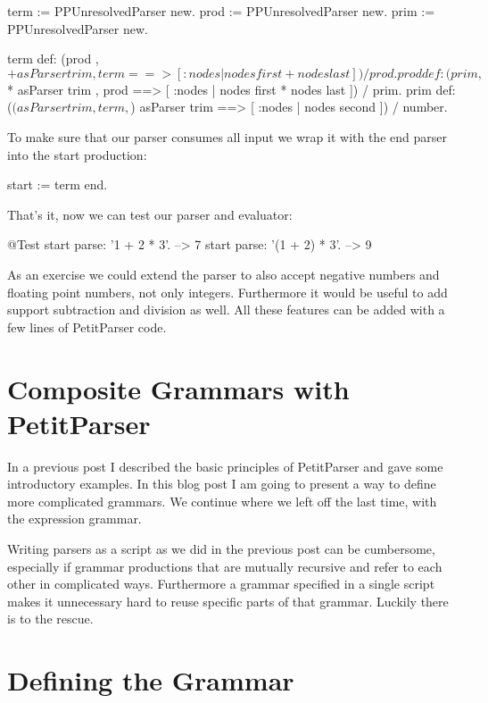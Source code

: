 \documentclass[a4paper,10pt,twoside]{book}
\begin{document}
\begin{code}{}
term := PPUnresolvedParser new.
prod := PPUnresolvedParser new.
prim := PPUnresolvedParser new.
 
term def: (prod , $+ asParser trim , term ==> [ :nodes | nodes first + nodes last ])
   / prod.
prod def: (prim , $* asParser trim , prod ==> [ :nodes | nodes first * nodes last ])
   / prim.
prim def: ($( asParser trim , term , $) asParser trim ==> [ :nodes | nodes second ])
   / number.
\end{code}

To make sure that our parser consumes all input we wrap it with the end parser into the start production:

\begin{code}{}
start := term end.
\end{code}

That's it, now we can test our parser and evaluator:

\begin{code}{@Test}
start parse: '1 + 2 * 3'.       --> 7
start parse: '(1 + 2) * 3'.     --> 9
\end{code}

As an exercise we could extend the parser to also accept negative
numbers and floating point numbers, not only integers. Furthermore it
would be useful to add support subtraction and division as well. All
these features can be added with a few lines of PetitParser code.

\section{Composite Grammars with PetitParser}

In a previous post I described the basic principles of PetitParser and
gave some introductory examples. In this blog post I am going to
present a way to define more complicated grammars. We continue where
we left off the last time, with the expression grammar.

Writing parsers as a script as we did in the previous post can be
cumbersome, especially if grammar productions that are mutually
recursive and refer to each other in complicated ways. Furthermore a
grammar specified in a single script makes it unnecessary hard to
reuse specific parts of that grammar. Luckily there is
 to the rescue.

\section{Defining the Grammar}
\end{document}
